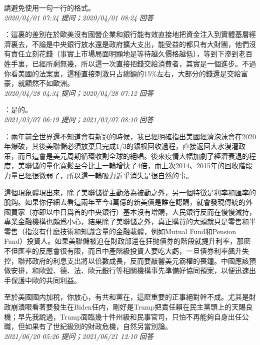 \documentclass[twocolumn]{ctexart}
\begin{document}
請避免使用一句一行的格式。
\\

\textit{\hfill\noindent\small 2020/04/01 07:34 提问；2020/04/01 08:24 回答}

：這裏的差別在於歐美沒有國營企業和銀行能有效直接地把資金注入到實體基層經濟裏去，不論是中央銀行放水還是政府擴大支出，能受益的都只有大財團，他們沒有責任立刻花錢（事實上市場局面明顯地是等待越久價格越低），等到下滲到老百姓手裏，已經所剩無幾，所以這一次直接把錢交給消費者，其實是一個進步。不過你看美國的法案裏，這種直接刺激只占總額的15\%左右，大部分的錢還是交給富豪，就顯然不如歐洲。
\\

\textit{\hfill\noindent\small 2020/04/28 04:34 提问；2020/04/28 07:12 回答}

：是的。
\\

\textit{\hfill\noindent\small 2021/03/07 06:19 提问；2021/03/07 08:10 回答}

：兩年前全世界還不知道會有新冠的時候，我已經明確指出美國經濟泡沫會在2020年爆破，其後美聯儲必須放棄只完成1/3的銀根回收過程，直接返回大水漫灌政策，而且這會是美元周期循環收割全球的絕唱。後來疫情大幅加劇了經濟衰退的程度，美聯儲的量化寬鬆至今比上一輪增快了4倍，而上次2014、2015年的回收階段力量已經很微弱了，所以這一輪吸力近乎消失是很自然的事。

這個現象體現出來，除了美聯儲從主動落為被動之外，另一個特徵是利率和匯率的脫鈎。如果你仔細去看這兩年至今4萬億的新美債是誰在認購，就會發現傳統的外國買家（亦即以中日爲首的中央銀行）基本沒有增購，人民銀行反而在慢慢減持，專業金融機構也頗爲小心，結果除了美聯儲之外，真正購買的大頭就只是零售和半零售（指沒有什麽技術和知識含量的金融載體，例如Mutual Fund和Pension Fund）投資人。如果美聯儲被迫在財政部還在狂抛債券的階段就提升利率，那麽不但匯率的反應會很有限，而且中產階級投資人要吃大虧，一旦債券利率飆升失控，聯邦政府的利息支出將以倍數成長，反而要敲響美元霸權的喪鐘。中國應該預做安排，和歐盟、德、法、歐元銀行等相關機構事先準備好協同預案，以便迅速出手保護中歐的共同利益。

至於美國國内加稅，你放心，有共和黨在，這麽重要的正事絕對幹不成。尤其是財政崩潰眼看著要發生在Biden任内，剛好是Trump把責任賴在民主黨頭上的天賜良機；早先我說過，Trump面臨幾十件州級和民事官司，只怕不再能夠自身出任公職，但如果有了世紀級別的財政危機，自然另當別論。
\\

\textit{\hfill\noindent\small 2021/06/20 05:26 提问；2021/06/21 12:10 回答}
\end{document}
